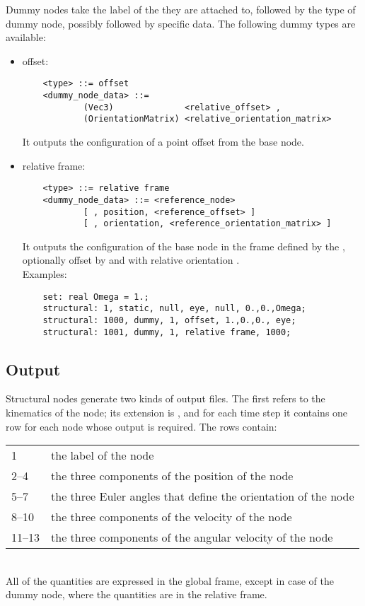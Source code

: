 Dummy nodes take the label of the  they are attached to, 
followed by the type of dummy node, possibly followed by specific data.
The following dummy types are available:

\begin{itemize}

    \item offset:
    \begin{verbatim}
    <type> ::= offset
    <dummy_node_data> ::=
            (Vec3)              <relative_offset> ,
            (OrientationMatrix) <relative_orientation_matrix>
    \end{verbatim}
    It outputs the configuration of a point offset from the base node.
            
    \item relative frame:
    \begin{verbatim}
    <type> ::= relative frame
    <dummy_node_data> ::= <reference_node>
            [ , position, <reference_offset> ]
            [ , orientation, <reference_orientation_matrix> ]
    \end{verbatim}
    It outputs the configuration of the base node in the frame defined
    by the , optionally offset 
    by  and with relative orientation 
    .\\
    Examples:
    \begin{verbatim}
    set: real Omega = 1.;
    structural: 1, static, null, eye, null, 0.,0.,Omega;
    structural: 1000, dummy, 1, offset, 1.,0.,0., eye;
    structural: 1001, dummy, 1, relative frame, 1000;
    \end{verbatim}

\end{itemize}

\subsection{Output}
Structural nodes generate two kinds of output files. 
The first refers to the kinematics of the node; its extension is ,
and for each time step it contains one row for each node whose output is
required.
The rows contain: \vspace{2mm} \\
\begin{tabular}{ll}
    \hline
    1      & the label of the node \\
    2--4   & the three components of the position of the node \\
    5--7   & the three Euler angles that define the orientation of the node \\
    8--10  & the three components of the velocity of the node \\
    11--13 & the three components of the angular velocity of the node \\
    \hline
\end{tabular}\vspace{2mm}\\
All of the quantities are expressed in the global frame, except in case of
the dummy  node, where the quantities are in the
relative frame.

